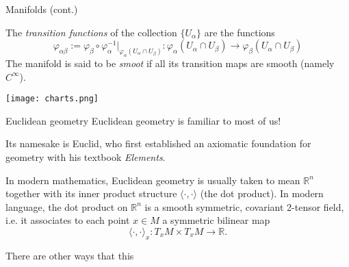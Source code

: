 \documentclass[handout]{beamer}
\newcommand{\RR}{\mathbb{R}}
\renewcommand{\phi}{\varphi}
\begin{document}
\begin{frame}{Manifolds (cont.)}

    \begin{definition}
    The \emph{transition functions} of the collection $\{U_\alpha\}$ are the functions 
    \[
      \phi_{\alpha \beta} := \phi_\beta \circ \phi^{-1} _\alpha |_{\phi_{\alpha}(U_\alpha \cap U_\beta)} : \phi_\alpha(U_\alpha \cap U_\beta) \to \phi_\beta(U_\alpha \cap U_\beta)
    \]
    The manifold is said to be \emph{smoot} if all its transition maps are smooth (namely $C^\infty$).
  \end{definition}
  \begin{center}
    \texttt{[image: charts.png]}
  \end{center}
\end{frame}


\begin{frame}{Euclidean geometry}
  Euclidean geometry is familiar to most of us! 

  Its namesake is Euclid, who first established an axiomatic foundation for geometry with his textbook \emph{Elements}.

  In modern mathematics, Euclidean geometry is usually taken to mean $\RR^n$ together with its inner product structure $\langle \cdot , \cdot \rangle$ (the dot product).
  In modern language, the dot product on $\RR^n$ is a smooth symmetric, covariant 2-tensor field, i.e. it associates to each point $x\in M$ a symmetric bilinear map 
  \[
    \langle \cdot , \cdot \rangle_x : T_xM \times T_xM \to \RR.
  \]

  There are other ways that this 
\end{frame}
\end{document}
